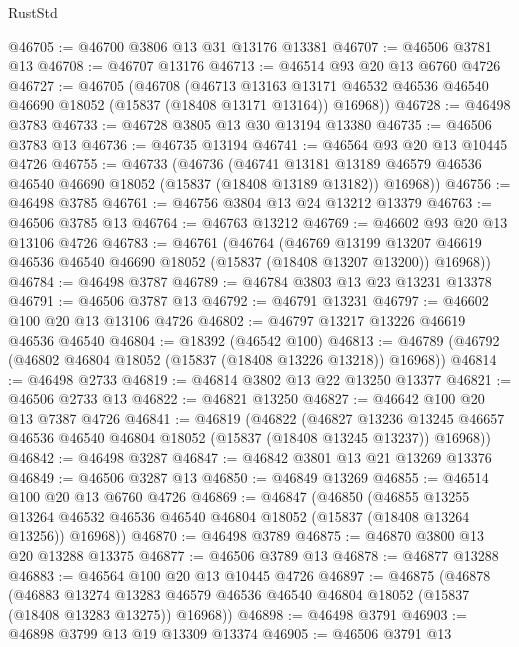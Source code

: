 \begin{lexlean}{RustStd}
\begin{coremodule}
@46705 := @46700 @3806 @13 @31 @13176 @13381
@46707 := @46506 @3781 @13
@46708 := @46707 @13176
@46713 := @46514 @93 @20 @13 @6760 @4726
@46727 := @46705
    (@46708
      (@46713
        @13163
        @13171
        @46532
        @46536
        @46540
        @46690
        @18052
        (@15837 (@18408 @13171 @13164))
        @16968))
@46728 := @46498 @3783
@46733 := @46728 @3805 @13 @30 @13194 @13380
@46735 := @46506 @3783 @13
@46736 := @46735 @13194
@46741 := @46564 @93 @20 @13 @10445 @4726
@46755 := @46733
    (@46736
      (@46741
        @13181
        @13189
        @46579
        @46536
        @46540
        @46690
        @18052
        (@15837 (@18408 @13189 @13182))
        @16968))
@46756 := @46498 @3785
@46761 := @46756 @3804 @13 @24 @13212 @13379
@46763 := @46506 @3785 @13
@46764 := @46763 @13212
@46769 := @46602 @93 @20 @13 @13106 @4726
@46783 := @46761
    (@46764
      (@46769
        @13199
        @13207
        @46619
        @46536
        @46540
        @46690
        @18052
        (@15837 (@18408 @13207 @13200))
        @16968))
@46784 := @46498 @3787
@46789 := @46784 @3803 @13 @23 @13231 @13378
@46791 := @46506 @3787 @13
@46792 := @46791 @13231
@46797 := @46602 @100 @20 @13 @13106 @4726
@46802 := @46797 @13217 @13226 @46619 @46536 @46540
@46804 := @18392 (@46542 @100)
@46813 := @46789 (@46792 (@46802 @46804 @18052 (@15837 (@18408 @13226 @13218)) @16968))
@46814 := @46498 @2733
@46819 := @46814 @3802 @13 @22 @13250 @13377
@46821 := @46506 @2733 @13
@46822 := @46821 @13250
@46827 := @46642 @100 @20 @13 @7387 @4726
@46841 := @46819
    (@46822
      (@46827
        @13236
        @13245
        @46657
        @46536
        @46540
        @46804
        @18052
        (@15837 (@18408 @13245 @13237))
        @16968))
@46842 := @46498 @3287
@46847 := @46842 @3801 @13 @21 @13269 @13376
@46849 := @46506 @3287 @13
@46850 := @46849 @13269
@46855 := @46514 @100 @20 @13 @6760 @4726
@46869 := @46847
    (@46850
      (@46855
        @13255
        @13264
        @46532
        @46536
        @46540
        @46804
        @18052
        (@15837 (@18408 @13264 @13256))
        @16968))
@46870 := @46498 @3789
@46875 := @46870 @3800 @13 @20 @13288 @13375
@46877 := @46506 @3789 @13
@46878 := @46877 @13288
@46883 := @46564 @100 @20 @13 @10445 @4726
@46897 := @46875
    (@46878
      (@46883
        @13274
        @13283
        @46579
        @46536
        @46540
        @46804
        @18052
        (@15837 (@18408 @13283 @13275))
        @16968))
@46898 := @46498 @3791
@46903 := @46898 @3799 @13 @19 @13309 @13374
@46905 := @46506 @3791 @13

\end{coremodule}
\end{lexlean}
